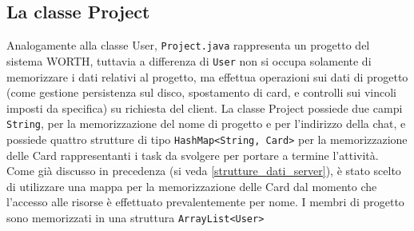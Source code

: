 \documentclass{article}
\begin{document}
\subsection{La classe Project}
Analogamente alla classe User, \texttt{Project.java} rappresenta un progetto del sistema WORTH, tuttavia a differenza di \texttt{User} non si occupa solamente di memorizzare i dati relativi al progetto, ma effettua operazioni sui dati di progetto (come gestione persistenza sul disco, spostamento di card, e controlli sui vincoli imposti da specifica) su richiesta del client.
La classe Project possiede due campi \texttt{String}, per la memorizzazione del nome di progetto e per l'indirizzo della chat, e possiede quattro strutture di tipo \texttt{HashMap<String, Card>} per la memorizzazione delle Card rappresentanti i task da svolgere per portare a termine l'attività. Come già discusso in precedenza (si veda \ref{strutture_dati_server}), è stato scelto di utilizzare una mappa per la memorizzazione delle Card dal momento che l'accesso alle risorse è effettuato prevalentemente per nome. I membri di progetto sono memorizzati in una struttura \texttt{ArrayList<User>}
\end{document}
